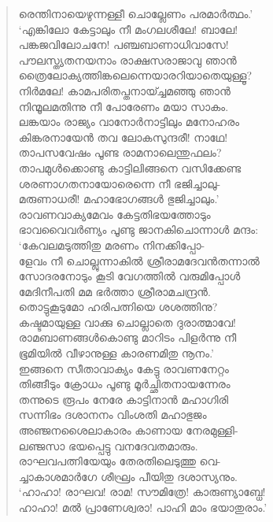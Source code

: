 \begin{verse}
രെന്തിനായെഴുന്നള്ളീ ചൊല്ലേണം പരമാര്‍ത്ഥം.’\\
‘എങ്കിലോ കേട്ടാലും നീ മംഗലശീലേ! ബാലേ!\\
പങ്കജവിലോചനേ! പഞ്ചബാണാധിവാസേ!\\
പൗലസ്ത്യതനയനാം രാക്ഷസരാജാവു ഞാന്‍\\
ത്രൈലോക്യത്തിങ്കലെന്നെയാരറിയാതെയുള്ളൂ?\\
നിര്‍മലേ! കാമപരിതപ്തനായ്ച്ചമഞ്ഞു ഞാന്‍\\
നിന്മൂലമതിന്നു നീ പോരേണം മയാ സാകം.\\
ലങ്കയാം രാജ്യം വാനോര്‍നാട്ടിലും മനോഹരം\\
കിങ്കരനായേന്‍ തവ ലോകസുന്ദരീ! നാഥേ!\\
താപസവേഷം പൂണ്ട രാമനാലെന്തുഫലം?\\
താപമുള്‍ക്കൊണ്ടു കാട്ടിലിങ്ങനെ വസിക്കേണ്ട\\
ശരണാഗതനായോരെന്നെ നീ ഭജിച്ചാലു-\\
മരുണാധരീ! മഹാഭോഗങ്ങള്‍ ഭുജിച്ചാലും.’\\
രാവണവാക്യമേവം കേട്ടതിഭയത്തോടും\\
ഭാവവൈവര്‍ണ്യം പൂണ്ടു ജാനകിചൊന്നാള്‍ മന്ദം:\\
‘കേവലമടുത്തിതു മരണം നിനക്കിപ്പോ-\\
ളേവം നീ ചൊല്ലുന്നാകില്‍ ശ്രീരാമദേവന്‍തന്നാല്‍\\
സോദരനോടും കൂടി വേഗത്തില്‍ വരുമിപ്പോള്‍\\
മേദിനീപതി മമ ഭര്‍ത്താ ശ്രീരാമചന്ദ്രന്‍.\\
തൊട്ടുകൂടുമോ ഹരിപത്നിയെ ശശത്തിനു?\\
കഷ്ടമായുള്ള വാക്കു ചൊല്ലാതെ ദുരാത്മാവേ!\\
രാമബാണങ്ങള്‍കൊണ്ടു മാറിടം പിളര്‍ന്നു നീ\\
ഭൂമിയില്‍ വീഴാനുള്ള കാരണമിതു നൂനം.’\\
ഇങ്ങനെ സീതാവാക്യം കേട്ടു രാവണനേറ്റം\\
തിങ്ങീടും ക്രോധം പൂണ്ടു മൂര്‍ച്ഛിതനായന്നേരം\\
തന്നുടെ രൂപം നേരേ കാട്ടിനാന്‍ മഹാഗിരി\\
സന്നിഭം ദശാനനം വിംശതി മഹാഭുജം\\
അഞ്ജനശൈലാകാരം കാണായ നേരമുള്ളി-\\
ലഞ്ജസാ ഭയപ്പെട്ടു വനദേവതമാരും.\\
രാഘവപത്നിയേയും തേരതിലെടുത്തു വെ-\\
ച്ചാകാശമാര്‍ഗേ ശീഘ്രം പീയിതു ദശാസ്യനും.\\
‘ഹാഹാ! രാഘവ! രാമ! സൗമിത്രേ! \hbox{കാരുണ്യാബ്ധേ!}\\
ഹാഹാ! മല്‍ പ്രാണേശ്വരാ! പാഹി മാം \hbox{ഭയാതുരാം.’}\\

\end{verse}
